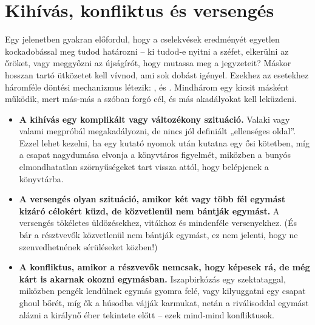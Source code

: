 \chapter{Kihívás, konfliktus és versengés}

Egy jelenetben gyakran előfordul, hogy a cselekvések eredményét egyetlen kockadobással meg tudod határozni – ki tudod‑e nyitni a széfet, elkerülni az őröket, vagy meggyőzni az újságírót, hogy mutassa meg a jegyzeteit? Máskor hosszan tartó ütközetet kell vívnod, ami sok dobást igényel. Ezekhez az esetekhez háromféle döntési mechanizmus létezik: ,  és . Mindhárom egy kicsit másként működik, mert más‑más a szóban forgó cél, és más akadályokat kell leküzdeni.

\begin{itemize}
    \item \textbf{A kihívás egy komplikált vagy változékony szituáció.} Valaki vagy valami megpróbál megakadályozni, de nincs jól definiált „ellenséges oldal”. Ezzel lehet kezelni, ha egy kutató nyomok után kutatna egy ősi kötetben, míg a csapat nagydumása elvonja a könyvtáros figyelmét, miközben a bunyós elmondhatatlan szörnyűségeket tart vissza attól, hogy belépjenek a könyvtárba.
    \item \textbf{A versengés olyan szituáció, amikor két vagy több fél egymást kizáró célokért küzd, de közvetlenül nem bántják egymást.} A versengés tökéletes üldözésekhez, vitákhoz és mindenféle versenyekhez. (És bár a résztvevők közvetlenül nem bántják egymást, ez nem jelenti, hogy ne szenvedhetnének sérüléseket közben!)
    \item \textbf{A konfliktus, amikor a részvevők nemcsak, hogy képesek rá, de még kárt is akarnak okozni egymásban.} Iszapbirkózás egy szektataggal, miközben pengék lendülnek egymás gyomra felé, vagy kilyuggatni egy csapat ghoul bőrét, míg ők a húsodba vájják karmukat, netán a riválisoddal egymást alázni a királynő éber tekintete előtt – ezek mind‑mind konfliktusok.
\end{itemize}
